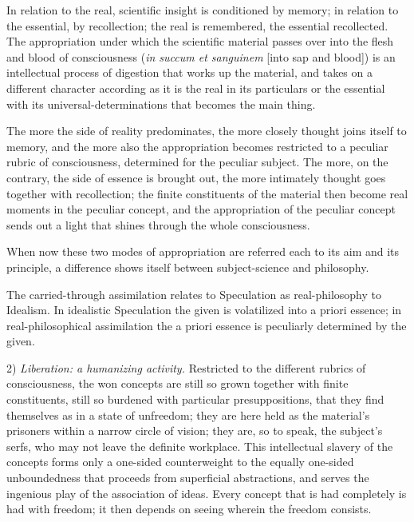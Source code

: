\documentclass[12pt]{book}
\begin{document}
In relation to the real, scientific insight is conditioned by memory; in relation to the essential, by
recollection; the real is remembered, the essential recollected. The appropriation under which the
scientific material passes over into the flesh and blood of consciousness (\textit{in succum et
sanguinem} [into sap and blood]) is an intellectual process of digestion that works up the material,
and takes on a different character according as it is the
real in its particulars or the essential with its universal-determinations that becomes the main thing.

The more the side of reality predominates, the more closely thought joins itself to memory, and the
more also the appropriation becomes restricted to a peculiar rubric of consciousness, determined for
the peculiar subject. The more, on the contrary, the side of essence is brought out, the more intimately
thought goes together with recollection; the finite constituents of the material then become real
moments in the peculiar concept, and the appropriation of the peculiar concept sends out a light that
shines through the whole consciousness.

When now these two modes of appropriation are referred each to its aim and its principle, a difference
shows itself between subject-science and philosophy.

The carried-through assimilation relates to Speculation as real-philosophy to Idealism. In idealistic
Speculation the given is volatilized into a priori essence; in real-philosophical assimilation the a
priori essence is peculiarly determined by the given.

2) \emph{Liberation: a humanizing activity.} Restricted to the different rubrics of consciousness, the
won concepts are still so grown together with finite constituents, still so burdened with particular
presuppositions, that they find themselves as in a state of unfreedom; they are here held as the
material's prisoners within a narrow circle of vision; they are, so to speak, the subject's serfs, who
may not leave the definite workplace. This intellectual slavery of the concepts forms only a one-sided
counterweight to the equally one-sided unboundedness that proceeds from superficial abstractions, and
serves the ingenious play of the association of ideas. Every concept that is had completely is had with
freedom; it then depends on seeing wherein the freedom consists.
\end{document}
